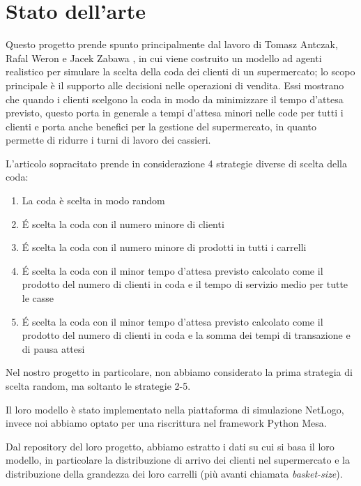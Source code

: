 \chapter{Stato dell'arte}


Questo progetto prende spunto principalmente dal lavoro di Tomasz Antczak, Rafal Weron e Jacek Zabawa \cite{article1}, in cui viene costruito un modello ad agenti realistico per simulare la scelta della coda dei clienti di un supermercato; lo scopo principale è il supporto alle decisioni nelle operazioni di vendita. Essi mostrano che quando i clienti scelgono la coda in modo da minimizzare il tempo d'attesa previsto, questo porta in generale a tempi d'attesa minori nelle code per tutti i clienti e porta anche benefici per la gestione del supermercato, in quanto permette di ridurre i turni di lavoro dei cassieri.

L'articolo sopracitato prende in considerazione 4 strategie diverse di scelta della coda:

\begin{enumerate}
	\item La coda è scelta in modo random
	\item \'E scelta la coda con il numero minore di clienti
	\item \'E scelta la coda con il numero minore di prodotti in tutti i carrelli
	\item \'E scelta la coda con il minor tempo d'attesa previsto calcolato come il prodotto del numero di clienti in coda e il tempo di servizio medio per tutte le casse
	\item \'E scelta la coda con il minor tempo d'attesa previsto calcolato come il prodotto del numero di clienti in coda e la somma dei tempi di transazione e di pausa attesi
\end{enumerate}

Nel nostro progetto in particolare, non abbiamo considerato la prima strategia di scelta random, ma soltanto le strategie 2-5.

Il loro modello è stato implementato nella piattaforma di simulazione NetLogo, invece noi abbiamo optato per una riscrittura nel framework Python Mesa. 

Dal repository del loro progetto, abbiamo estratto i dati su cui si basa il loro modello, in particolare la distribuzione di arrivo dei clienti nel supermercato e la distribuzione della grandezza dei loro carrelli (più avanti chiamata \textit{basket-size}).

